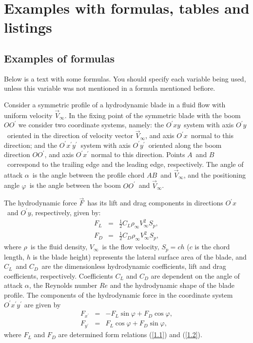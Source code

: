 \section{Examples with formulas, tables and listings}

\subsection{Examples of formulas}
Below is a text with some formulas. You should specify each variable being used, unless this variable was not mentioned in a formula mentioned befiore.

Consider a symmetric profile of a hydrodynamic blade in a fluid flow with uniform velocity $\overrightarrow{V}_{\infty
} $. In the fixing point of the symmetric blade with the boom $OO^{\prime }$
we consider two coordinate systems, namely: the $O^{\prime }xy$\ system with
axis $O^{\prime }y$\ oriented in the direction of velocity vector $\overrightarrow{V}_{\infty }$, and axis $O^{\prime }x$\ normal to this direction; and the $O^{\prime }x^{\prime }y^{\prime }$\ system with axis $O^{\prime }y^{\prime }$\ oriented along the boom direction $OO^{\prime }$, and axis $O^{\prime }x^{\prime }$ normal to this direction. Points $A$\ and $B$\ correspond to the trailing edge and the leading edge, respectively. The angle of attack $\alpha $\ is the angle between the profile chord $AB$\ and $\overrightarrow{V}_{\infty}$, and the positioning angle $\varphi $\ is the
angle between the boom $OO^{\prime }$\ and $\overrightarrow{V}_{\infty }$.

The hydrodynamic force $\overrightarrow{F}$\ has its lift and drag components in directions $O^{\prime }x$\ and $O^{\prime }y$, respectively, given by:
\begin{eqnarray}
F_{L} &=&\frac{1}{2}C_{L}\rho _{\infty }V_{\infty }^{2}S_{p},  \label{1.1} \\
F_{D} &=&\frac{1}{2}C_{D}\rho _{\infty }V_{\infty }^{2}S_{p},  \label{1.2}
\end{eqnarray}
where $\rho $\ is the fluid density, $V_{\infty }$\ is the flow velocity, $S_{p}=ch$ ($c$ is the chord length, $h$ is the blade height) represents the lateral surface area of the blade, and $C_{L}$\ and $C_{D}$\ are the
dimensionless hydrodynamic coefficients, lift and drag coefficients, respectively. Coefficients $C_{L}$ and $C_{D}$ are dependent on the angle of attack $\alpha $, the Reynolds number $Re$ and the hydrodynamic shape of the blade profile. The components of the hydrodynamic force in the coordinate system $O^{\prime }x^{\prime }y^{\prime }$ are given by
\begin{eqnarray}
F_{x^{\prime }} &=&-F_{L}\sin \varphi +F_{D}\cos \varphi,  \label{1.3} \\
F_{y^{\prime }} &=&F_{L}\cos \varphi +F_{D}\sin \varphi , \label{1.4}
\end{eqnarray}
where $F_L$ and $F_D$ are determined form relations (\ref{1.1}) and (\ref{1.2}). 

